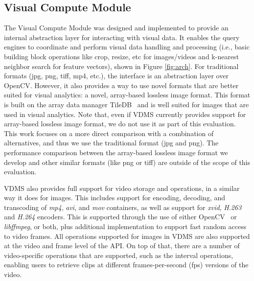 \subsection{Visual Compute Module}


The Visual Compute Module was designed and implemented to provide
an internal abstraction layer for interacting with visual data.
It enables the query engines to coordinate and perform
visual data handling and processing
(i.e., basic building block operations like crop, resize, etc for images/videos
and k-nearest neighbor search for feature vectors),
shown in Figure \ref{fig:arch}.
For traditional formats (jpg, png, tiff, mp4, etc.),
the interface is an abstraction layer over OpenCV.
However, it also provides a way to use novel formats that are
better suited for visual analytics: a novel, array-based lossless image format.
This format is built on the array data manager TileDB~\cite{TileDB} and
is well suited for images that are used in visual analytics.
Note that, even if VDMS currently provides support for array-based lossless
image format, we do not use it as part of this evaluation.
This work focuses on a more direct comparison with a combination of alternatives,
and thus we use the traditional format (jpg and png).
The performance comparison between the array-based lossless image format
we develop and other similar formats (like png or tiff) are outside of the
scope of this evaluation.

VDMS also provides full support for video storage and operations,
in a similar way it does for images.
This includes support for encoding, decoding, and transcoding of
\textit{mp4}, \textit{avi}, and \textit{mov} containers,
as well as support for \textit{xvid}, \textit{H.263} and \textit{H.264} encoders.
This is supported through the use of either OpenCV~\cite{opencv}
or \textit{libffmpeg}\cite{ffmpeg}, or both,
plus additional implementation to support fast random access to video frames.
All operations supported for images in VDMS are also supported at the
video and frame level of the API.
On top of that, there are a number of video-specific operations that
are supported, such as the interval operations,
enabling users to retrieve clips at different
frames-per-second (fps) versions of the video.

